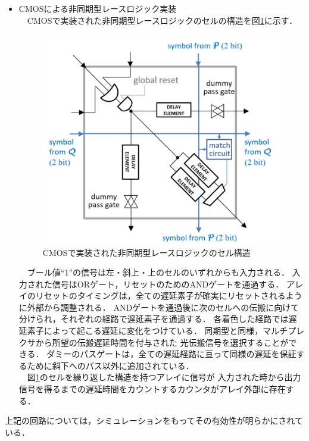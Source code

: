 \begin{itemize}
\item CMOSによる非同期型レースロジック実装\\
\ \ CMOSで実装された非同期型レースロジックのセルの構造を図\ref{fig:CMOSasync}に示す．\\
\begin{figure}[t!]
\begin{center}
\includegraphics[keepaspectratio,scale=0.3]{fig/2/CMOSasync.png}
\caption{CMOSで実装された非同期型レースロジックのセル構造\cite{madhavan20174}}
\label{fig:CMOSasync}
\end{center}
\end{figure}
\ \ ブール値“1”の信号は左・斜上・上のセルのいずれからも入力される．
入力された信号はORゲート，リセットのためのANDゲートを通過する．
アレイのリセットのタイミングは，全ての遅延素子が確実にリセットされるように外部から調整される．
ANDゲートを通過後に次のセルへの伝搬に向けて分けられ，それぞれの経路で遅延素子を通過する．
各着色した経路では遅延素子によって起こる遅延に変化をつけている．
同期型と同様，マルチプレクサから所望の伝搬遅延時間を付与された
光伝搬信号を選択することができる．
ダミーのパスゲートは，全ての遅延経路に亘って同様の遅延を保証するために斜下へのパス以外に追加されている．\\
\ \ 図\ref{fig:CMOSasync}のセルを繰り返した構造を持つアレイに信号が
入力された時から出力信号を得るまでの遅延時間をカウントするカウンタがアレイ外部に存在する．
\end{itemize}
上記の回路については，シミュレーションをもってその有効性が明らかにされている．


